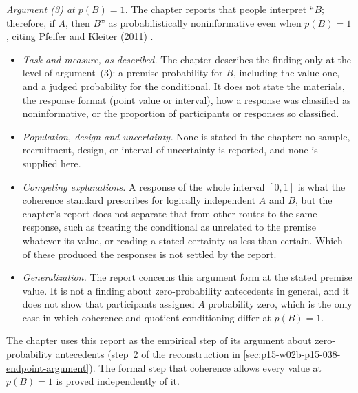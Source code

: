 \emph{Argument (3) at \(p(B)=1\).} The chapter reports that people
interpret ``\(B\); therefore, if \(A\), then \(B\)'' as
probabilistically noninformative even when \(p(B)=1\), citing Pfeifer
and Kleiter (2011) \cite[p.~279]{Pfeifer2021ProbabilityLogic}.
\begin{itemize}
\item \emph{Task and measure, as described.} The chapter describes the
      finding only at the level of argument~(3): a premise probability
      for \(B\), including the value one, and a judged probability for
      the conditional. It does not state the materials, the response
      format (point value or interval), how a response was classified as
      noninformative, or the proportion of participants or responses so
      classified.
\item \emph{Population, design and uncertainty.} None is stated in the
      chapter: no sample, recruitment, design, or interval of
      uncertainty is reported, and none is supplied here.
\item \emph{Competing explanations.} A response of the whole interval
      \([0,1]\) is what the coherence standard prescribes for logically
      independent \(A\) and \(B\), but the chapter's report does not
      separate that from
      other routes to the same response, such as treating the
      conditional as unrelated to the premise whatever its value, or
      reading a stated certainty as less than certain. Which of these
      produced the responses is not settled by the report.
\item \emph{Generalization.} The report concerns this argument form
      at the stated premise value. It is not a finding about
      zero-probability antecedents in general, and it does not show that
      participants assigned \(A\) probability zero, which is the only
      case in which coherence and quotient conditioning differ at
      \(p(B)=1\).
\end{itemize}
The chapter uses this report as the empirical step of its argument
about zero-probability antecedents (step~2 of the reconstruction in
\cref{sec:p15-w02b-p15-038-endpoint-argument}). The formal step that coherence
allows every value at \(p(B)=1\) is proved independently of it.

